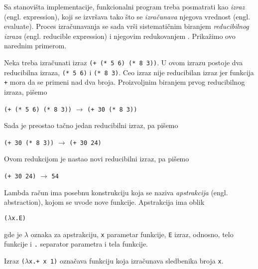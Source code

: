Sa stanovišta implementacije, funkcionalni program treba posmatrati kao \textit{izraz} (engl. expression), koji se izvršava tako što se \textit{izračunava} njegova vrednost (engl. evaluate). Proces izračunavanja se sada vrši sistematičnim biranjem \textit{reducibilnog izraza} (engl. reducible expression) i njegovim redukovanjem \cite{the-implementation-of-functional-programming-languages}. Prikažimo ovo narednim primerom.

\begin{primer}
	Neka treba izračunati izraz \verb|(+ (* 5 6) (* 8 3))|. U ovom izrazu postoje dva reducibilna izraza, \verb|(* 5 6)| i \verb|(* 8 3)|. Ceo izraz nije reducibilan izraz jer funkcija \verb|+| mora da se primeni nad dva broja. Proizvoljnim biranjem prvog reducibilnog izraza, pišemo
	\begin{center}
		\verb|(+ (* 5 6) (* 8 3))| $\rightarrow$ \verb|(+ 30 (* 8 3))|
	\end{center}
	Sada je preostao tačno jedan reducibilni izraz, pa pišemo
	\begin{center}
		\verb|(+ 30 (* 8 3))| $\rightarrow$ \verb|(+ 30 24)|
	\end{center}
	Ovom redukcijom je nastao novi reducibilni izraz, pa pišemo
	\begin{center}
		\verb|(+ 30 24)| $\rightarrow$ \verb|54|
	\end{center}
\end{primer}

Lambda račun ima posebnu konstrukciju koja se naziva \textit{apstrakcija} (engl. abstraction), kojom se uvode nove funkcije. Apstrakcija ima oblik
\begin{center}
	\verb|(|$\lambda$\verb|x.E)|
\end{center} 
gde je $\lambda$ oznaka za apstrakciju, \verb|x| parametar funkcije, \verb|E| izraz, odnosno, telo funkcije i \verb|.| separator parametra i tela funkcije.  
\begin{primer}
	Izraz \verb|(|$\lambda$\verb|x.+ x 1)| označava funkciju koja izračunava sledbenika broja \verb|x|.
\end{primer}

